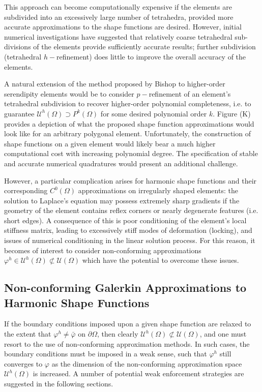 	This approach can become computationally expensive if the elements are subdivided into an excessively large number of tetrahedra, provided more accurate approximations to the shape functions are desired. However, initial numerical investigations have suggested that relatively coarse tetrahedral sub-divisions of the elements provide sufficiently accurate results; further subdivision (tetrahedral $h-$refinement) does little to improve the overall accuracy of the elements.
	
	A natural extension of the method proposed by Bishop to higher-order serendipity elements would be to consider $p-$refinement of an element's tetrahedral subdivision to recover higher-order polynomial completeness, i.e. to guarantee $\mathcal{U}^h (\Omega) \supset P^{k} (\Omega)$ for some desired polynomial order $k$. Figure (K) provides a depiction of what the proposed shape function approximations would look like for an arbitrary polygonal element. Unfortunately, the construction of shape functions on a given element would likely bear a much higher computational cost with increasing polynomial degree. The specification of stable and accurate numerical quadratures would present an additional challenge.
	
	However, a particular complication arises for harmonic shape functions and their corresponding $C^0 (\Omega)$ approximations on irregularly shaped elements: the solution to Laplace's equation may possess extremely sharp gradients if the geometry of the element contains reflex corners or nearly degenerate features (i.e. short edges). A consequence of this is poor conditioning of the element's local stiffness matrix, leading to excessively stiff modes of deformation (locking), and issues of numerical conditioning in the linear solution process. For this reason, it becomes of interest to consider non-conforming approximations $\varphi^h \in \mathcal{U}^h (\Omega) \not\subset \mathcal{U} (\Omega)$ which have the potential to overcome these issues.
	
\subsection*{Non-conforming Galerkin Approximations to \\ Harmonic Shape Functions}

	If the boundary conditions imposed upon a given shape function are relaxed to the extent that $\varphi^h \neq \bar{\varphi}$ on $\partial \Omega$, then clearly $\mathcal{U}^h (\Omega) \not\subset \mathcal{U} (\Omega)$, and one must resort to the use of non-conforming approximation methods. In such cases, the boundary conditions must be imposed in a weak sense, such that $\varphi^h$ still converges to $\varphi$ as the dimension of the non-conforming approximation space $\mathcal{U}^h (\Omega)$ is increased. A number of potential weak enforcement strategies are suggested in the following sections.
	
